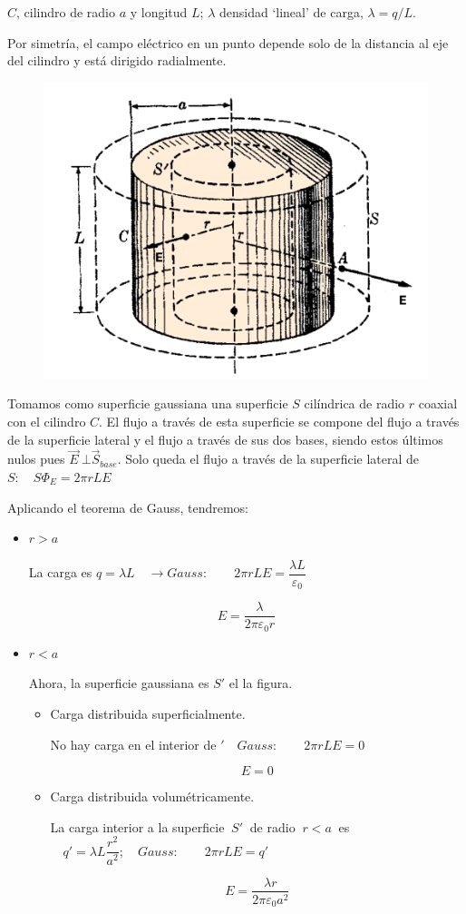 $C$, cilindro de radio $a$ y longitud $L$; $\lambda$ densidad `lineal' de carga, $\lambda=q/L$.

Por simetría, el campo eléctrico en un punto depende solo de la distancia al eje del cilindro y está dirigido radialmente.

\begin{figure}[H]
	\centering
	\includegraphics[width=.6\textwidth]{imagenes/imagenes23/T23IM14.png}
\end{figure}


Tomamos como superficie gaussiana una superficie $S$ cilíndrica de radio $r$ coaxial con el cilindro $C$. El flujo a través de esta superficie se compone del flujo a través de la superficie lateral y el flujo a través de sus dos bases, siendo estos últimos nulos pues $\vec E \ \bot \vec S_{base}$. Solo queda el flujo a través de la superficie lateral de $S:\quad S\Phi_E=2\pi r L E$

Aplicando el teorema de Gauss, tendremos:

\begin{itemize}
\item $r>a$

La carga es $q=\lambda L \quad \to Gauss: \qquad 2\pi rL E=\dfrac{\lambda L}{\varepsilon_0}$

$$E=\dfrac \lambda {2\pi \varepsilon_0 r}$$
\item $r<a$

Ahora, la superficie gaussiana es $S'$ el la figura.

	\begin{itemize}
	\item Carga distribuida superficialmente.
	
	No hay carga en el interior de $' \quad Gauss:\qquad 2\pi r L E=0$
	
	$$E=0$$
	\item Carga distribuida volumétricamente.
	
	La carga interior a la superficie $\ S' \ $ de radio $\ r<a\ $ es $\quad q'=\lambda L \dfrac {r^2}{a^2}; \quad Gauss: \qquad 2\pi r L E=q'$
	
	$$E=\dfrac{\lambda r}{2 \pi \varepsilon_0 a^2}$$
	\end{itemize}	
\end{itemize}


